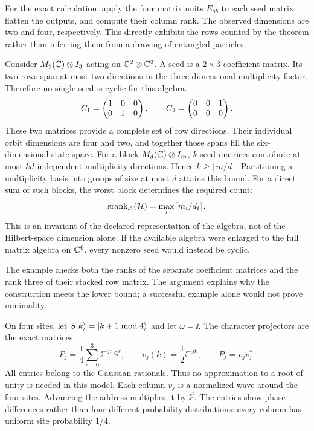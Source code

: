 For the exact calculation, apply the four matrix units $E_{ab}$ to each seed matrix, flatten the outputs, and compute their column rank. The observed dimensions are two and four, respectively. This directly exhibits the rows counted by the theorem rather than inferring them from a drawing of entangled particles.

Consider $M_2(\mathbb C)\otimes I_3$ acting on $\mathbb C^2\otimes\mathbb C^3$. A seed is a $2\times3$ coefficient matrix. Its two rows span at most two directions in the three-dimensional multiplicity factor. Therefore no single seed is cyclic for this algebra.
\[
C_1=\begin{pmatrix}1&0&0\\0&1&0\end{pmatrix},\qquad
C_2=\begin{pmatrix}0&0&1\\0&0&0\end{pmatrix}.
\]
These two matrices provide a complete set of row directions. Their individual orbit dimensions are four and two, and together those spans fill the six-dimensional state space.
For a block $M_d(\mathbb C)\otimes I_m$, $k$ seed matrices contribute at most $kd$ independent multiplicity directions. Hence $k\ge\lceil m/d\rceil$. Partitioning a multiplicity basis into groups of size at most $d$ attains this bound. For a direct sum of such blocks, the worst block determines the required count:
\[
\operatorname{srank}_{\mathcal A}(\mathcal H)=\max_i\lceil m_i/d_i\rceil.
\]
This is an invariant of the declared representation of the algebra, not of the Hilbert-space dimension alone. If the available algebra were enlarged to the full matrix algebra on $\mathbb C^6$, every nonzero seed would instead be cyclic.

The example checks both the ranks of the separate coefficient matrices and the rank three of their stacked row matrix. The argument explains why the construction meets the lower bound; a successful example alone would not prove minimality.

On four sites, let $S\lvert k\rangle=\lvert k+1\bmod4\rangle$ and let $\omega=\ii$. The character projectors are the exact matrices
\[
P_j=\frac14\sum_{r=0}^3\ii^{-jr}S^r,
\qquad v_j(k)=\frac12\ii^{-jk},\qquad P_j=v_jv_j^*.
\]
All entries belong to the Gaussian rationals. Thus no approximation to a root of unity is needed in this model.
Each column $v_j$ is a normalized wave around the four sites. Advancing the address multiplies it by $\ii^j$. The entries show phase differences rather than four different probability distributions: every column has uniform site probability $1/4$.

